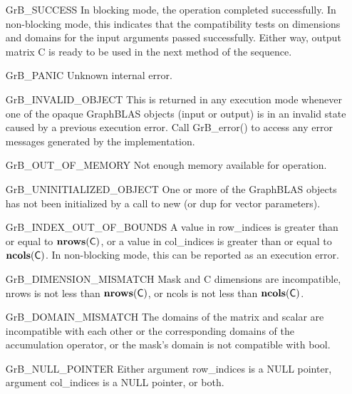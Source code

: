 \begin{itemize}[leftmargin=2.1in]
    \item[{\sf GrB\_SUCCESS}]         In blocking mode, the operation completed
    successfully. In non-blocking mode, this indicates that the compatibility 
    tests on dimensions and domains for the input arguments passed successfully. 
    Either way, output matrix {\sf C} is ready to be used in the next method of 
    the sequence.

    \item[{\sf GrB\_PANIC}]            Unknown internal error.
    
    \item[{\sf GrB\_INVALID\_OBJECT}] This is returned in any execution mode 
    whenever one of the opaque GraphBLAS objects (input or output) is in an invalid 
    state caused by a previous execution error.  Call {\sf GrB\_error()} to access 
    any error messages generated by the implementation.

    \item[{\sf GrB\_OUT\_OF\_MEMORY}]  Not enough memory available for operation.

    \item[{\sf GrB\_UNINITIALIZED\_OBJECT}] One or more of the GraphBLAS objects
    has not been initialized by a call to {\sf new} (or {\sf dup} for vector
    parameters).

    \item[{\sf GrB\_INDEX\_OUT\_OF\_BOUNDS}]  A value in {\sf row\_indices} is greater
    than or equal to $\bold{nrows}({\sf C})$, or a value in {\sf col\_indices} is greater
    than or equal to $\bold{ncols}({\sf C})$.  In non-blocking mode, this can be
    reported as an execution error.

    \item[{\sf GrB\_DIMENSION\_MISMATCH}]  {\sf Mask} and {\sf C} dimensions are
    incompatible, {\sf nrows} is not less than $\bold{nrows}({\sf C})$, or
    {\sf ncols} is not less than $\bold{ncols}({\sf C})$. 

    \item[{\sf GrB\_DOMAIN\_MISMATCH}]     The domains of the matrix and scalar are
	incompatible with each other or the corresponding domains of the 
    accumulation operator, or the mask's domain is not compatible with {\sf bool}.

    \item[{\sf GrB\_NULL\_POINTER}] Either argument {\sf row\_indices} is a {\sf NULL} pointer,
	    argument {\sf col\_indices} is a {\sf NULL} pointer, or both.
\end{itemize}


